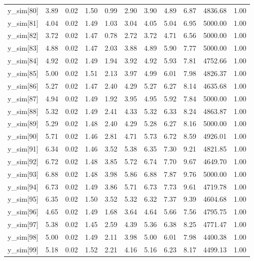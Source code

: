 \begin{table}[ht]
\begin{tabular}{rrrrrrrrrrr}
  y\_sim[80] & 3.89 & 0.02 & 1.50 & 0.99 & 2.90 & 3.90 & 4.89 & 6.87 & 4836.68 & 1.00 \\ 
  y\_sim[81] & 4.04 & 0.02 & 1.49 & 1.03 & 3.04 & 4.05 & 5.04 & 6.95 & 5000.00 & 1.00 \\ 
  y\_sim[82] & 3.72 & 0.02 & 1.47 & 0.78 & 2.72 & 3.72 & 4.71 & 6.56 & 5000.00 & 1.00 \\ 
  y\_sim[83] & 4.88 & 0.02 & 1.47 & 2.03 & 3.88 & 4.89 & 5.90 & 7.77 & 5000.00 & 1.00 \\ 
  y\_sim[84] & 4.92 & 0.02 & 1.49 & 1.94 & 3.92 & 4.92 & 5.93 & 7.81 & 4752.66 & 1.00 \\ 
  y\_sim[85] & 5.00 & 0.02 & 1.51 & 2.13 & 3.97 & 4.99 & 6.01 & 7.98 & 4826.37 & 1.00 \\ 
  y\_sim[86] & 5.27 & 0.02 & 1.47 & 2.40 & 4.29 & 5.27 & 6.27 & 8.14 & 4635.68 & 1.00 \\ 
  y\_sim[87] & 4.94 & 0.02 & 1.49 & 1.92 & 3.95 & 4.95 & 5.92 & 7.84 & 5000.00 & 1.00 \\ 
  y\_sim[88] & 5.32 & 0.02 & 1.49 & 2.41 & 4.33 & 5.32 & 6.33 & 8.24 & 4863.87 & 1.00 \\ 
  y\_sim[89] & 5.29 & 0.02 & 1.48 & 2.40 & 4.29 & 5.28 & 6.27 & 8.16 & 5000.00 & 1.00 \\ 
  y\_sim[90] & 5.71 & 0.02 & 1.46 & 2.81 & 4.71 & 5.73 & 6.72 & 8.59 & 4926.01 & 1.00 \\ 
  y\_sim[91] & 6.34 & 0.02 & 1.46 & 3.52 & 5.38 & 6.35 & 7.30 & 9.21 & 4821.85 & 1.00 \\ 
  y\_sim[92] & 6.72 & 0.02 & 1.48 & 3.85 & 5.72 & 6.74 & 7.70 & 9.67 & 4649.70 & 1.00 \\ 
  y\_sim[93] & 6.88 & 0.02 & 1.48 & 3.98 & 5.86 & 6.88 & 7.87 & 9.76 & 5000.00 & 1.00 \\ 
  y\_sim[94] & 6.73 & 0.02 & 1.49 & 3.86 & 5.71 & 6.73 & 7.73 & 9.61 & 4719.78 & 1.00 \\ 
  y\_sim[95] & 6.35 & 0.02 & 1.50 & 3.52 & 5.32 & 6.32 & 7.37 & 9.39 & 4604.68 & 1.00 \\ 
  y\_sim[96] & 4.65 & 0.02 & 1.49 & 1.68 & 3.64 & 4.64 & 5.66 & 7.56 & 4795.75 & 1.00 \\ 
  y\_sim[97] & 5.38 & 0.02 & 1.45 & 2.59 & 4.39 & 5.36 & 6.38 & 8.25 & 4771.47 & 1.00 \\ 
  y\_sim[98] & 5.00 & 0.02 & 1.49 & 2.11 & 3.98 & 5.00 & 6.01 & 7.98 & 4400.38 & 1.00 \\ 
  y\_sim[99] & 5.18 & 0.02 & 1.52 & 2.21 & 4.16 & 5.16 & 6.23 & 8.17 & 4499.13 & 1.00 \\ 

\end{tabular}
\end{table}
